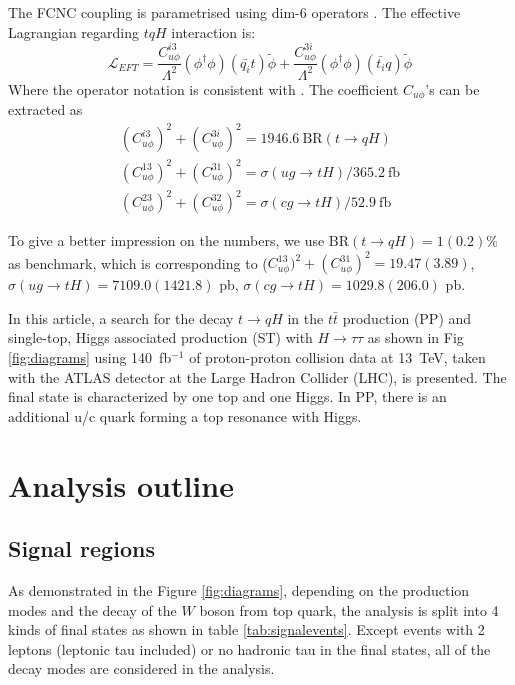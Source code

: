 The FCNC coupling is parametrised using dim-6 operators \cite{fcnc_production_theory}. The effective Lagrangian regarding $tqH$ interaction is:
%
\begin{equation}
\mathcal{L}_{EFT} = \frac{C^{i3}_{u\phi}}{\Lambda^{2}}(\phi^{\dagger}\phi)(\bar{q_{i}}t)\tilde{\phi} + \frac{C^{3i}_{u\phi}}{\Lambda^{2}}(\phi^{\dagger}\phi)(\bar{t_{i}}q)\tilde{\phi}
\label{eq:eq01}
\end{equation}
%
Where the operator notation is consistent with \cite{fcnc_production_theory}. The coefficient $C_{u\phi}$'s can be extracted as
\begin{equation}
\begin{array}{l}
(C^{i3}_{u\phi})^2 + (C^{3i}_{u\phi})^2 = 1946.6~\text{BR}(t\to qH)\\
(C^{13}_{u\phi})^2 + (C^{31}_{u\phi})^2 = \sigma(ug\to tH)/365.2~\text{fb}\\
(C^{23}_{u\phi})^2 + (C^{32}_{u\phi})^2 = \sigma(cg\to tH)/52.9~\text{fb}
\end{array}
\label{eq:eq02}
\end{equation}

To give a better impression on the numbers, we use $\text{BR}(t\to qH)=1(0.2)\%$ as benchmark, which is corresponding to ($C^{13}_{u\phi})^2 + (C^{31}_{u\phi})^2=19.47(3.89)$, $\sigma(ug\to tH)=7109.0(1421.8)$ pb, $\sigma(cg\to tH)=1029.8(206.0)$ pb.

In this article, a search for the decay $t\to qH$ in the $t\bar{t}$ production (PP) and single-top, Higgs associated production (ST) with $H\to\tau\tau$  as shown in Fig \ref{fig:diagrams} using 140~fb$^{-1}$ of proton-proton collision data at 13~TeV, taken with the ATLAS detector at the Large Hadron Collider (LHC), is presented. The final state is characterized by one top and one Higgs. In PP, there is an additional u/c quark forming a top resonance with Higgs.



\section{Analysis outline}

\subsection{Signal regions}
\label{sec:SRs}
As demonstrated in the Figure \ref{fig:diagrams}, depending on the production modes and the decay of the $W$ boson from top quark, the analysis is split into 4 kinds of final states as shown in table \ref{tab:signalevents}. Except events with 2 leptons (leptonic tau included) or no hadronic tau in the final states, all of the decay modes are considered in the analysis.


